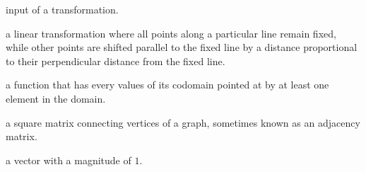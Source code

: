 \documentclass[../gatm.tex]{subfiles}
\begin{document}
\begin{description}[align=left]
\item[preimage] input of a transformation.

\item[shear] a linear transformation where all points along a particular line remain fixed, while other points are shifted parallel to the fixed line by a distance proportional to their perpendicular distance from the fixed line.

\item[surjective function] a function that has every values of its codomain pointed at by at least one element in the domain.

\item[transportation matrix] a square matrix connecting vertices of a graph, sometimes known as an adjacency matrix.

\item[unit vector] a vector with a magnitude of $1$.

\end{description}
\end{document}

